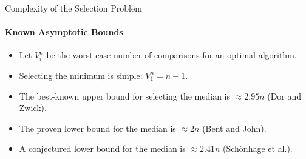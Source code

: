 \begin{frame}{Complexity of the Selection Problem}
  \framesubtitle{Known Asymptotic Bounds}
  \begin{itemize}
    \item<+-> Let $V_i^n$ be the worst-case number of comparisons for an optimal algorithm.
    \item<+-> Selecting the minimum is simple: $V_1^n= n-1$.
    \item<+-> The best-known upper bound for selecting the median is $\approx 2.95n$ (Dor and Zwick).
    \item<+-> The proven lower bound for the median is $\approx 2n$ (Bent and John).
    \item<+-> A conjectured lower bound for the median is $\approx 2.41n$ (Schönhage et al.).
  \end{itemize}
\end{frame}

